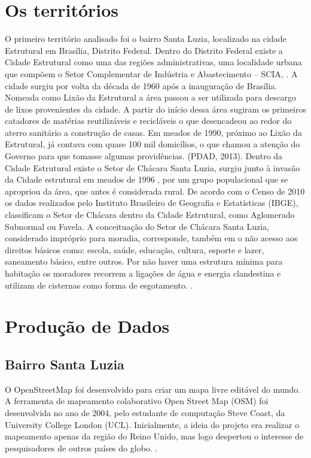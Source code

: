\section{Os territórios}

O primeiro território analisado foi o bairro Santa Luzia, localizado na cidade Estrutural em Brasília, Distrito Federal.  Dentro do Distrito Federal existe a Cidade Estrutural como uma das regiões administrativas, uma localidade urbana que compõem o Setor Complementar de Indústria e
Abastecimento – SCIA, \cite{souza2016nao}.
A cidade surgiu por volta da década de 1960 após a inauguração de Brasília. Nomeada como Lixão da Estrutural a área passou a ser utilizada para descargo de lixos provenientes da cidade. A partir do início dessa área sugiram os primeiros catadores de matérias reutilizáveis e recicláveis o que desencadeou ao redor do aterro sanitário a construção de casas. Em meados de 1990, próximo ao Lixão da Estrutural, já contava com quase 100 mil domicílios, o que chamou a atenção do Governo para que tomasse algumas providências. (PDAD, 2013).
Dentro da Cidade Estrutural existe o Setor de Chácara Santa Luzia, surgiu junto à invasão da Cidade estrutural em meados de 1996 , por um grupo populacional que se apropriou da área, que antes é considerada rural. De acordo com o Censo de 2010 os dados realizados pelo Instituto Brasileiro de Geografia e Estatísticas (IBGE), classificam o Setor de Chácara dentro da Cidade Estrutural, como Aglomerado Subnormal ou Favela. \cite{souza2016nao}
A conceituação do Setor de Chácara Santa Luzia, considerado impróprio para moradia, corresponde, também em o não acesso aos direitos básicos como: escola, saúde, educação, cultura, esporte e lazer, saneamento básico, entre outros. Por não haver uma estrutura mínima para habitação os moradores recorrem a ligações de água e energia clandestina e utilizam de cisternas como forma de esgotamento. \cite{souza2016nao}.




\section{Produção de Dados}

\subsection{Bairro Santa Luzia}

O OpenStreetMap foi desenvolvido para criar um mapa livre editável do mundo. A ferramenta de mapeamento colaborativo Open Street Map (OSM) foi desenvolvida no ano de 2004, pelo estudante de computação Steve Coast, da University College London (UCL). Inicialmente, a ideia do projeto era realizar o mapeamento apenas da região do Reino Unido, mas logo despertou o interesse de pesquisadores de outros países do globo. \cite{ramm2011openstreetmap}.

